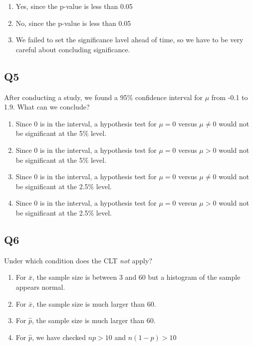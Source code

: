 \documentclass[
  letterpaper,
  DIV=11,
  numbers=noendperiod,
  oneside]{scrreprt}
\providecommand{\tightlist}{%
  \setlength{\itemsep}{0pt}\setlength{\parskip}{0pt}}\usepackage{longtable,booktabs,array}
\begin{document}
\pspace

\begin{enumerate}
\def\labelenumi{\arabic{enumi}.}
\tightlist
\item
  Yes, since the p-value is less than 0.05
\item
  No, since the p-value is less than 0.05
\item
  We failed to set the significance lavel ahead of time, so we have to
  be very careful about concluding significance.
\end{enumerate}

\hypertarget{q5-1}{%
\subsection{Q5}\label{q5-1}}

After conducting a study, we found a 95\% confidence interval for
\(\mu\) from -0.1 to 1.9. What can we conclude?

\pspace

\begin{enumerate}
\def\labelenumi{\arabic{enumi}.}
\tightlist
\item
  Since 0 is in the interval, a hypothesis test for \(\mu = 0\) versus
  \(\mu \ne 0\) would not be significant at the 5\% level.
\item
  Since 0 is in the interval, a hypothesis test for \(\mu = 0\) versus
  \(\mu > 0\) would not be significant at the 5\% level.
\item
  Since 0 is in the interval, a hypothesis test for \(\mu = 0\) versus
  \(\mu \ne 0\) would not be significant at the 2.5\% level.
\item
  Since 0 is in the interval, a hypothesis test for \(\mu = 0\) versus
  \(\mu > 0\) would not be significant at the 2.5\% level.
\end{enumerate}

\hypertarget{q6}{%
\subsection{Q6}\label{q6}}

Under which condition does the CLT \emph{not} apply?

\pspace

\begin{enumerate}
\def\labelenumi{\arabic{enumi}.}
\tightlist
\item
  For \(\bar x\), the sample size is between 3 and 60 but a histogram of
  the sample appears normal.
\item
  For \(\bar x\), the sample size is much larger than 60.
\item
  For \(\hat p\), the sample size is much larger than 60.
\item
  For \(\hat p\), we have checked \(np>10\) and \(n(1-p)>10\)
\end{enumerate}
\end{document}
